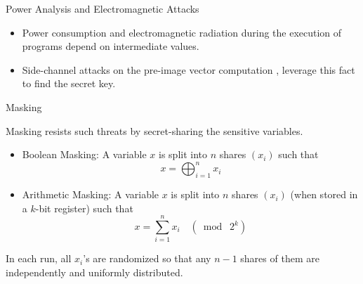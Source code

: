 \begin{frame}{Power Analysis and Electromagnetic Attacks}

\begin{itemize}
\item Power consumption and electromagnetic radiation during the execution of programs depend on intermediate values.
\pause
\item Side-channel attacks on the pre-image vector computation \cite{KA21, TCHES:GMRR22}, leverage this fact to find the secret key. 
\pause
\end{itemize}

\end{frame}



\begin{frame}{Masking}

Masking resists such threats by secret-sharing the sensitive variables.
\pause
\begin{itemize}
	\item Boolean Masking: A variable $x$ is split into $n$ shares $(x_i)$ such that
	\[
	x = \bigoplus_{i=1}^n x_i
	\]
	\pause
	\item Arithmetic Masking: A variable $x$ is split into $n$ shares $(x_i)$ (when stored in a $k$-bit register) such that
	\[
	x = \sum_{i=1}^n x_i \quad (\bmod\; 2^k)
	\]
\end{itemize}
\medskip
In each run, all $x_i$'s are randomized so that any $n-1$ shares of them are independently and uniformly distributed.

\end{frame}

